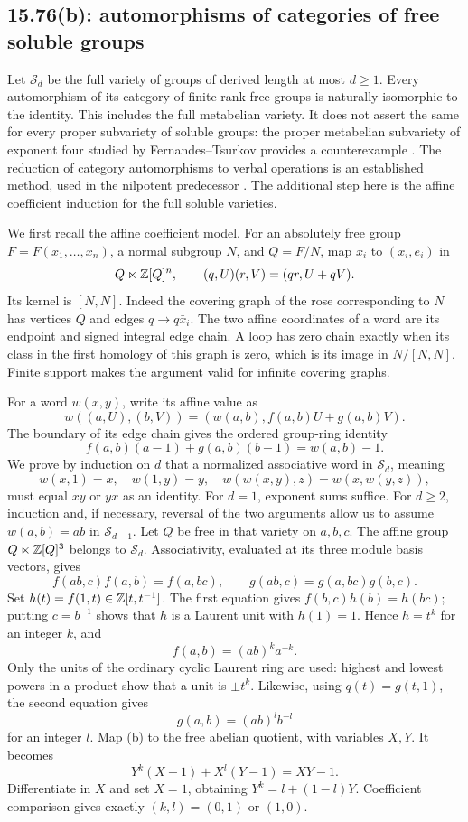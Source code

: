 \subsection{15.76(b): automorphisms of categories of free soluble groups}
\label{cand:15.76}
Let \(\mathcal S_d\) be the full variety of groups of derived length
at most \(d\ge1\). Every automorphism of its category of finite-rank
free groups is naturally isomorphic to the identity.
This includes the full metabelian variety. It does not assert the same
for every proper subvariety of soluble groups: the proper metabelian
subvariety of exponent four studied by Fernandes--Tsurkov provides a counterexample
\cite{fernandes-tsurkov}.
The reduction of category automorphisms to verbal operations is an
established method, used in the nilpotent predecessor
\cite{tsurkov-nilpotent}. The additional step here is the affine
coefficient induction for the full soluble varieties.

We first recall the affine coefficient model. For an absolutely free
group \(F=F(x_1,\ldots,x_n)\), a normal subgroup \(N\), and \(Q=F/N\),
map \(x_i\) to \((\bar x_i,e_i)\) in
\[
 Q\ltimes\mathbb Z[Q]^n,\qquad(q,U)(r,V)=(qr,U+qV).
\]
Its kernel is \([N,N]\). Indeed the covering graph of the rose
corresponding to \(N\) has vertices \(Q\) and edges
\(q\to q\bar x_i\). The two affine coordinates of a word are its
endpoint and signed integral edge chain. A loop has zero chain
exactly when its class in the first homology of this graph is zero,
which is its image in \(N/[N,N]\).
Finite support makes the argument valid for infinite covering graphs.

For a word \(w(x,y)\), write its affine value as
\[
 w((a,U),(b,V))=(w(a,b),f(a,b)U+g(a,b)V).
\]
The boundary of its edge chain gives the ordered group-ring identity
\[
 f(a,b)(a-1)+g(a,b)(b-1)=w(a,b)-1.                 \tag{b}
\]
We prove by induction on \(d\) that a normalized associative word in
\(\mathcal S_d\), meaning
\[
 w(x,1)=x,\quad w(1,y)=y,\quad
 w(w(x,y),z)=w(x,w(y,z)),
\]
must equal \(xy\) or \(yx\) as an identity.
For \(d=1\), exponent sums suffice.
For \(d\ge2\), induction and, if necessary, reversal of the two
arguments allow us to assume \(w(a,b)=ab\) in \(\mathcal S_{d-1}\).
Let \(Q\) be free in that variety on \(a,b,c\).
The affine group \(Q\ltimes\mathbb Z[Q]^3\) belongs to \(\mathcal S_d\).
Associativity, evaluated at its three module basis vectors, gives
\[
 f(ab,c)f(a,b)=f(a,bc),\qquad
 g(ab,c)=g(a,bc)g(b,c).
\]
Set \(h(t)=f(1,t)\in\mathbb Z[t,t^{-1}]\).
The first equation gives \(f(b,c)h(b)=h(bc)\);
putting \(c=b^{-1}\) shows that \(h\) is a Laurent unit with
\(h(1)=1\). Hence \(h=t^k\) for an integer \(k\), and
\[
 f(a,b)=(ab)^ka^{-k}.
\]
Only the units of the ordinary cyclic Laurent ring are used:
highest and lowest powers in a product show that a unit is
\(\pm t^k\). Likewise, using \(q(t)=g(t,1)\), the second equation gives
\[
 g(a,b)=(ab)^lb^{-l}
\]
for an integer \(l\).
Map (b) to the free abelian quotient, with variables \(X,Y\).
It becomes
\[
 Y^k(X-1)+X^l(Y-1)=XY-1.
\]
Differentiate in \(X\) and set \(X=1\), obtaining
\(Y^k=l+(1-l)Y\).
Coefficient comparison gives exactly \((k,l)=(0,1)\) or \((1,0)\).


